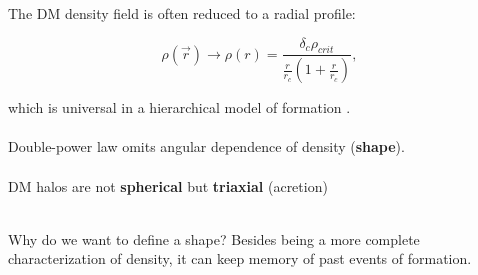 \documentclass[xcolor=dvipsnames]{beamer}
\begin{document}
\begin{frame}
\small
The DM density field is often reduced to a radial profile:

\begin{equation}
\rho(\vec{r}) \rightarrow \rho(r) = \frac{\delta_c \rho_{crit}}{\frac{r}{r_c}\left( 1 + \frac{r}{r_c}\right)},
\end{equation}

which is universal in a hierarchical model of formation \cite{Navarro1997}.\\~\\

Double-power law omits angular dependence of density (\textbf{shape}).\\~\\

DM halos are not \textbf{spherical} but \textbf{triaxial} \cite{Allgood2006} (acretion)\\~\\

\begin{block}
{Why do we want to define a shape?}
Besides being a more complete characterization of density, it can keep memory of past events of formation.
\end{block}

\end{frame}
\end{document}
